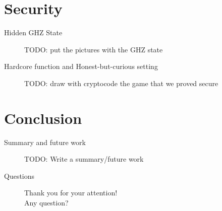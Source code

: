 \documentclass[]{beamer}
\begin{document}
\section{Security}

\begin{frame}[t]{Hidden GHZ State}
  \begin{figure}[ht]
    \centering
    TODO: put the pictures with the GHZ state
  \end{figure}
\end{frame}

\begin{frame}[t]{Hardcore function and Honest-but-curious setting}
  \begin{figure}[ht]
    \centering
    TODO: draw with cryptocode the game that we proved secure
  \end{figure}
\end{frame}


\section{Conclusion}
\begin{frame}{Summary and future work}
    \begin{figure}[ht]
      \centering
      TODO: Write a summary/future work
  \end{figure}
\end{frame}

\begin{frame}{Questions}
  \begin{figure}[ht]
    \centering
    Thank you for your attention!\\
    Any question?
  \end{figure}
\end{frame}
\end{document}

